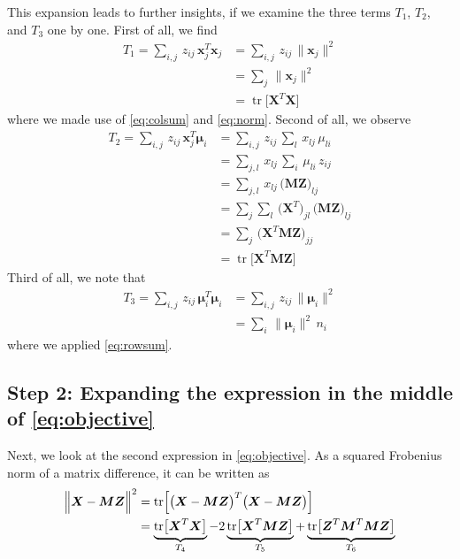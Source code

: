 \documentclass[fleqn]{llncs}
\newcommand{\mat}[1]{\boldsymbol{{#1}}}
\renewcommand{\vec}[1]{\boldsymbol{{#1}}}
\newcommand{\nrm}[1]{\bigl \lVert #1 \bigr \rVert^2}
\newcommand{\DSQ}[2]{\Bigl \lVert #1 - #2 \Bigr \rVert^2}
\newcommand{\tr}[1]{\operatorname{tr} \bigl [ #1 \bigr ]}
\newcommand{\TR}[1]{\operatorname{tr} \Bigl [ #1 \Bigr ]}
\begin{document}
This expansion leads to further insights, if we examine the three terms $T_1$, $T_2$, and $T_3$ one by one. First of all, we find
\begin{align}
T_1 = \sum_{i, j} \, z_{ij} \, \vec{x}_j^T \vec{x}_j
& = \sum_{i, j} \, z_{ij} \, \nrm{\vec{x}_j} \\
& = \sum_j \, \nrm{\vec{x}_j} \\
& = \tr{\mat{X}^T \mat{X}}
\end{align}
where we made use of \eqref{eq:colsum} and \eqref{eq:norm}. Second of all, we observe
\begin{align}
T_2 = \sum_{i, j} \, z_{ij} \, \vec{x}_j^T \vec{\mu}_i
& = \sum_{i, j} \, z_{ij} \, \sum_l \, x_{lj} \, \mu_{li} \\
& = \sum_{j, l} \, x_{lj} \, \sum_{i} \, \mu_{li} \, z_{ij} \\
& = \sum_{j, l} \, x_{lj} \, \bigl( \mat{M} \mat{Z} \bigr)_{lj} \\
& = \sum_j \sum_l \, \bigl( \mat{X}^T \bigr)_{jl} \, \bigl( \mat{M} \mat{Z} \bigr)_{lj} \\
& = \sum_j \, \bigl( \mat{X}^T \mat{M} \mat{Z} \bigr)_{jj} \\
& = \tr{\mat{X}^T \mat{M} \mat{Z}}
\end{align}
Third of all, we note that
\begin{align}
T_3 = \sum_{i, j} \, z_{ij} \, \vec{\mu}_i^T \vec{\mu}_i
& = \sum_{i, j} \, z_{ij} \, \nrm{\vec{\mu}_i} \\
& = \sum_i \, \nrm{\vec{\mu}_i} \, n_i
\end{align}
where we applied \eqref{eq:rowsum}.



\subsection{Step 2: Expanding the expression in the middle of \eqref{eq:objective}}

Next, we look at the second expression in \eqref{eq:objective}. As a squared Frobenius norm of a matrix difference, it can be written as
\begin{align}
\label{eq:expandm}
\DSQ{\mat{X}}{\mat{M} \mat{Z}}
& = \TR{\bigl( \mat{X} - \mat{M} \mat{Z} \bigr)^T \bigl( \mat{X} - \mat{M} \mat{Z} \bigr)} \notag \\
& = \underbrace{\tr{\mat{X}^T \mat{X}}}_{T_4}
- 2 \underbrace{\tr{\mat{X}^T \mat{M} \mat{Z}}}_{T_5}
+   \underbrace{\tr{\mat{Z}^T \mat{M}^T \mat{M} \mat{Z}}}_{T_6}
\end{align}
\end{document}
